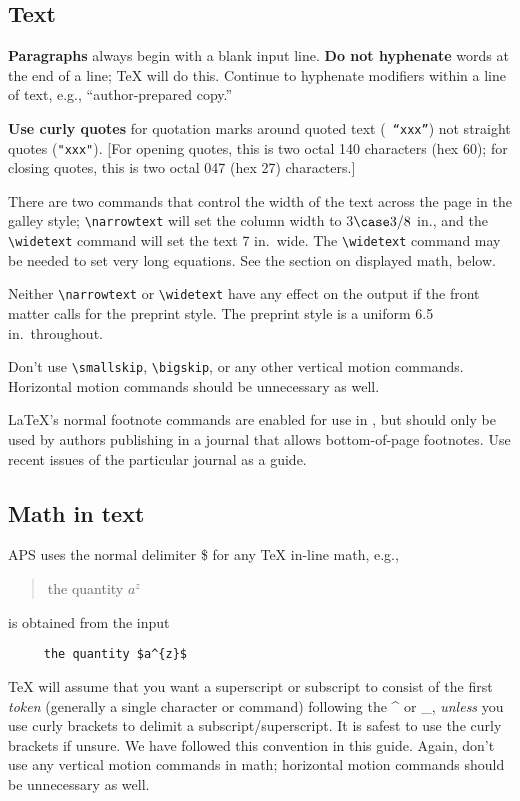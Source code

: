 \subsection{Text}

{\bf Paragraphs} always begin with a blank input line. {\bf Do not
hyphenate} words at the end of a line; \TeX{} will do this.  Continue to
hyphenate modifiers within a line of text, e.g., ``author-prepared copy.''

{\bf Use curly quotes} for quotation marks around quoted text ({\tt
``xxx''}) not straight quotes ({\tt "xxx"}).  [For opening quotes, this is
two octal 140 characters (hex 60); for closing quotes, this is  two octal
047 (hex 27) characters.]

There are two commands that control the width of the text across the page
in the galley style; \verb+\narrowtext+ will set the column width to
3$\case3/8$ in., and the \verb+\widetext+ command will set the text 7 in.\
wide.  The \verb+\widetext+ command may be needed to set very long equations. 
See the section on displayed math, below.

Neither \verb+\narrowtext+ or \verb+\widetext+ have any effect on the
output if the front matter calls for the preprint style.  The preprint
style is a uniform 6.5 in.\ throughout.

Don't use \verb+\smallskip+, \verb+\bigskip+, or any other vertical motion
commands. Horizontal motion commands should be unnecessary as well.

\LaTeX's normal footnote commands are enabled for use in \REVTeX{}, but
should only be used by authors publishing in a journal that allows
bottom-of-page footnotes.  Use recent issues of the particular journal as a
guide.

\subsection{Math in text}

APS uses the normal delimiter \$ for any \TeX{} in-line
math, e.g.,
\begin{quote}
     {the quantity $a^{z}$}
\end{quote}
is obtained from the input
\begin{verbatim}
     the quantity $a^{z}$
\end{verbatim}

\TeX{} will assume that you want a superscript or subscript to consist of
the first {\em token\/} (generally a single character or command) following
the \^{} or \_, {\em unless\/} you use curly brackets to delimit a
subscript/superscript. It is safest to use the curly brackets if unsure. We
have followed this convention in this guide. Again, don't use any vertical
motion commands in math; horizontal motion commands should be unnecessary
as well.

